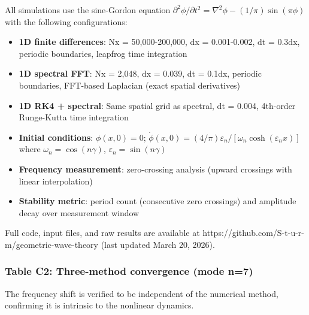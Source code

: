 \documentclass[
]{article}
\providecommand{\tightlist}{%
  \setlength{\itemsep}{0pt}\setlength{\parskip}{0pt}}
\begin{document}
All simulations use the sine-Gordon equation
\(\partial^2\phi/\partial t^2 = \nabla^2\phi - (1/\pi)\sin(\pi\phi)\)
with the following configurations:

\begin{itemize}
\tightlist
\item
  \textbf{1D finite differences}: Nx = 50,000-200,000, dx = 0.001-0.002,
  dt = 0.3dx, periodic boundaries, leapfrog time integration
\item
  \textbf{1D spectral FFT}: Nx = 2,048, dx = 0.039, dt = 0.1dx, periodic
  boundaries, FFT-based Laplacian (exact spatial derivatives)
\item
  \textbf{1D RK4 + spectral}: Same spatial grid as spectral, dt = 0.004,
  4th-order Runge-Kutta time integration
\item
  \textbf{Initial conditions}: \(\phi(x,0) = 0\);
  \(\dot{\phi}(x,0) = (4/\pi)\varepsilon_n/[\omega_n \cosh(\varepsilon_n x)]\)
  where \(\omega_n = \cos(n\gamma)\), \(\varepsilon_n = \sin(n\gamma)\)
\item
  \textbf{Frequency measurement}: zero-crossing analysis (upward
  crossings with linear interpolation)
\item
  \textbf{Stability metric}: period count (consecutive zero crossings)
  and amplitude decay over measurement window
\end{itemize}

Full code, input files, and raw results are available at
https://github.com/S-t-u-r-m/geometric-wave-theory (last updated March
20, 2026).

\subsubsection{Table C2: Three-method convergence (mode
n=7)}\label{table-c2-three-method-convergence-mode-n7}

The frequency shift is verified to be independent of the numerical
method, confirming it is intrinsic to the nonlinear dynamics.
\end{document}
